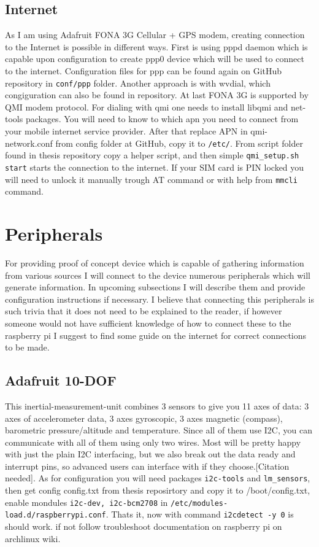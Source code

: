 \subsection{Internet} %
\label{sub:internet}
As I am using Adafruit FONA 3G Cellular + GPS modem, creating connection to the Internet is possible in different ways. First is using pppd daemon which is capable upon configuration to create ppp0 device which will be used to connect to the internet. Configuration files for ppp can be found again on GitHub repository in \verb|conf/ppp| folder. Another approach is with wvdial, which congiguration can also be found in repository. At last FONA 3G is supported by QMI modem protocol. For dialing with qmi one needs to install libqmi and net-tools packages. You will need to know to which apn you need to connect from your mobile internet service provider. After that replace APN in qmi-network.conf from config folder at GitHub, copy it to \verb|/etc/|. From script folder found in thesis repository copy a helper script, and then simple \verb|qmi_setup.sh start| starts the connection to the internet. If your SIM card is PIN locked you will need to unlock it manually trough AT command or with help from \verb|mmcli| command.
\newpage
\section{Peripherals} %
\label{sec:peripherals}
For providing proof of concept device which is capable of gathering information from various sources I will connect to the device numerous peripherals which will generate information. In upcoming subsections I will describe them and provide configuration instructions if necessary. I believe that connecting this peripherals is such trivia that it does not need to be explained to the reader, if however someone would not have sufficient knowledge of how to connect these to the raspberry pi I suggest to find some guide on the internet for correct connections to be made.
\subsection{Adafruit 10-DOF} %
\label{sub:adafruit_10_dof}
This inertial-measurement-unit combines 3 sensors  to give you 11 axes of data: 3 axes of accelerometer data, 3 axes gyroscopic, 3 axes magnetic (compass), barometric pressure/altitude and temperature. Since all of them use I2C, you can communicate with all of them using only two wires. Most will be pretty happy with just the plain I2C interfacing, but we also break out the data ready and interrupt pins, so advanced users can interface with if they choose.[Citation needed]. As for configuration you will need packages \verb|i2c-tools| and \verb|lm_sensors|, then get config config.txt from thesis reposirtory and copy it to /boot/config.txt, enable mondules \verb|i2c-dev, i2c-bcm2708| in \verb|/etc/modules-load.d/raspberrypi.conf|. Thats it, now with command \verb|i2cdetect -y 0| is should work. if not follow troubleshoot documentation on raspberry pi on archlinux wiki.

